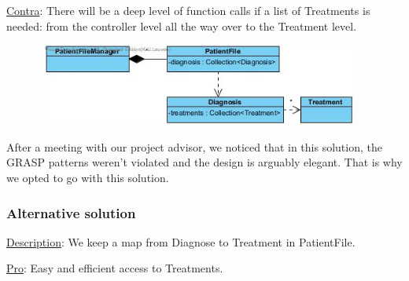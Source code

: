 \documentclass[11pt]{article}
\begin{document}
\underline{Contra}: There will be a deep level of function calls if a list of Treatments is needed: from the controller level all the way over to the Treatment level.
\begin{center}
\includegraphics[width=130mm, height=27mm]{patientfilediagwin.jpg}
\end{center}
After a meeting with our project advisor, we noticed that in this solution, the GRASP patterns weren’t violated and the design is arguably elegant. That is why we opted to go with this solution.
\subsubsection{Alternative solution}
\underline{Description}: We keep a map from Diagnose to Treatment in PatientFile.

\underline{Pro}: Easy and efficient access to Treatments.
\end{document}
